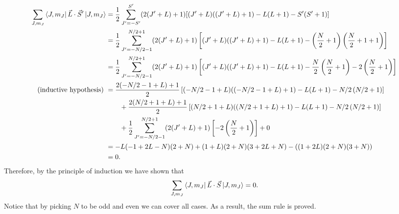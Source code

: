 \documentclass{article}
\theoremstyle{definition}
\newcommand{\f}[2]{\frac{#1}{#2}}
\newcommand{\lp}{\left(}
\newcommand{\rp}{\right)}
\newcommand{\lb}{\left[}
\newcommand{\rb}{\right]}
\begin{document}
\begin{enumerate}[label=(\alph*)]
	\begin{align*}
	\sum_{J,m_J} \bra{J,m_J} \vec{L}\cdot \vec{S}' \ket{J,m_J} 
	&= \f{1}{2} \sum_{J'={-S'}}^{{S'}} (2 (J' + L) + 1)[(J' + L) ((J' + L) + 1) - L (L + 1) - S' (S' + 1)] \\
	&= \f{1}{2} \sum_{J'={-N/2-1}}^{{N/2+1}} (2 (J' + L) + 1)\lb (J' + L) ((J' + L) + 1) - L (L + 1) - \lp \f{N}{2} + 1\rp \lp \f{N}{2} + 1 + 1\rp \rb \\
	&= \f{1}{2} \sum_{J'={-N/2-1}}^{{N/2+1}} (2 (J' + L) + 1)\lb (J' + L) ((J' + L) + 1) - L (L + 1) - \f{N}{2}\lp \f{N}{2} + 1 \rp - 2\lp \f{N}{2} + 1 \rp\rb \\
	\text{(inductive hypothesis)  }&= \f{2 (-N/2-1 + L) + 1}{2}\lb (-N/2-1 + L) ((-N/2-1 + L) + 1) - L (L + 1) - N/2\lp N/2 + 1 \rp\rb \\
	&\quad\quad + \f{2 (N/2+1 + L) + 1}{2}\lb (N/2+1 + L) ((N/2+1 + L) + 1) - L (L + 1) - N/2\lp N/2 + 1 \rp\rb \\
	&\quad\quad + \f{1}{2}\sum_{J'=-N/2-1}^{N/2+1} (2 (J' + L) + 1) \lb -2\lp \f{N}{2}+1 \rp \rb + 0 \\
	&= -L (-1 + 2 L - N) (2 + N) + (1 + L) (2 + N) (3 + 2 L + N) -((1 + 2 L) (2 + N) (3 + N)) \\
	&= 0. 
	\end{align*}
	Therefore, by the principle of induction we have shown that 
	\begin{align*}
	\sum_{J,m_J} \bra{J,m_J} \vec{L}\cdot \vec{S} \ket{J,m_J}  = 0.
	\end{align*}
	Notice that by picking $N$ to be odd and even we can cover all cases. As a result, the sum rule is proved. 
	

\end{enumerate}
\end{document}
